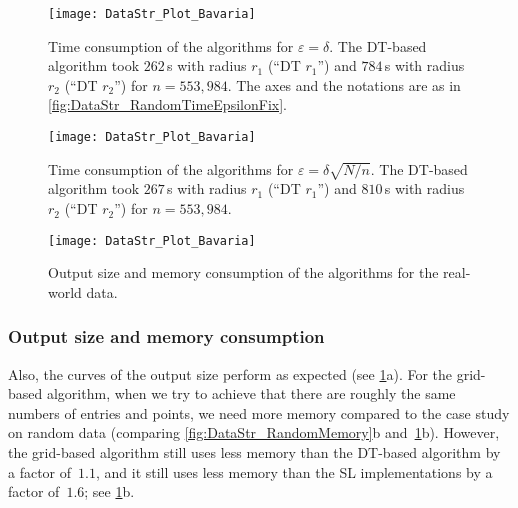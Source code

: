 \begin{figure}[h]	
\centering
\texttt{[image: DataStr\_Plot\_Bavaria]}
\vspace{-3mm}
\caption{Time consumption of the algorithms for 
	$\varepsilon=\delta$. 
	The DT-based algorithm took  
	$262\,$s with radius $r_1$ (``DT $r_1$'') and  
	$784\,$s with radius $r_2$ (``DT $r_2$'') for 
	$n=553{,}984$. 
	The axes and the notations are as in 
	\fig\ref{fig:DataStr_RandomTimeEpsilonFix}.}
\label{fig:DataStr_BavariaTimeEpsilonFix}
%	
\vspace{8mm}
%
\centering
\texttt{[image: DataStr\_Plot\_Bavaria]}
\vspace{-3mm}
\caption{Time consumption of the algorithms for 
	$\varepsilon=\delta\sqrt{N/n}$. 
	The DT-based algorithm took 
	$267\,$s with radius $r_1$ (``DT $r_1$'') and  
	$810\,$s with radius $r_2$ (``DT $r_2$'') for 
	$n=553{,}984$.}
\label{fig:DataStr_BavariaTimeEpsilonDecrease}
%	
\vspace{8mm}
%
\centering
\texttt{[image: DataStr\_Plot\_Bavaria]}
\vspace{-6mm}
\caption{Output size and memory consumption 
	of the algorithms for the real-world data.}
\label{fig:DataStr_BavariaMemory}
\end{figure}


\subsubsection{Output size and memory consumption}
Also, the curves of the output size perform as expected
(see \fig\ref{fig:DataStr_BavariaMemory}a). 
For the grid-based algorithm, when we try to achieve that 
there are roughly the same numbers of entries and points, 
we need more memory compared to the case study on random data
(comparing \figs\ref{fig:DataStr_RandomMemory}b
and~\ref{fig:DataStr_BavariaMemory}b). 
However, the grid-based algorithm still uses less memory 
than the DT-based algorithm by a factor of~$1.1$, 
and it still uses less memory than the SL 
implementations by a factor of~$1.6$;
see \fig\ref{fig:DataStr_BavariaMemory}b.


